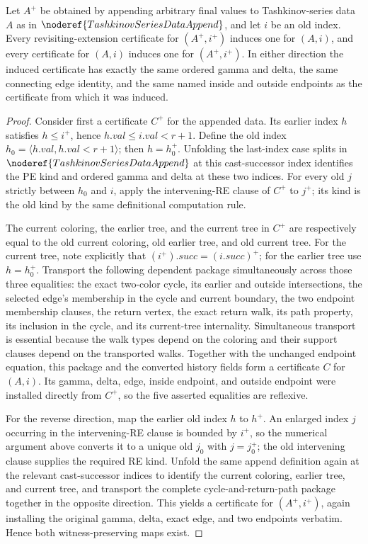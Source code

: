 \begin{lemma}
Let \(A^+\) be obtained by appending arbitrary final values to Tashkinov-series
data \(A\) as in \(\noderef{TashkinovSeriesDataAppend}\), and let \(i\) be an
old index.  Every revisiting-extension certificate for \((A^+,i^+)\) induces
one for \((A,i)\), and every certificate for \((A,i)\) induces one for
\((A^+,i^+)\).  In either direction the induced certificate has exactly the
same ordered gamma and delta, the same connecting edge identity, and the same
named inside and outside endpoints as the certificate from which it was
induced.
\end{lemma}
\begin{proof}
Consider first a certificate \(C^+\) for the appended data.  Its earlier index
\(h\) satisfies \(h\leq i^+\), hence
\(h.val\leq i.val<r+1\).  Define the old index
\(h_0=\langle h.val,h.val<r+1\rangle\); then \(h=h_0^+\).  Unfolding the
last-index case splits in \(\noderef{TashkinovSeriesDataAppend}\) at this
cast-successor index identifies the PE kind and ordered gamma and delta at
these two indices.  For every old
\(j\) strictly between \(h_0\) and \(i\), apply the intervening-RE clause of
\(C^+\) to \(j^+\); its kind is the old kind by the same definitional
computation rule.

The current coloring, the earlier tree, and the current tree in \(C^+\) are
respectively equal to the old current coloring, old earlier tree, and old
current tree.  For the current tree, note explicitly that
\((i^+).succ=(i.succ)^+\); for the earlier tree use \(h=h_0^+\).
Transport the following dependent package simultaneously across those three
equalities: the exact two-color cycle, its earlier and outside intersections,
the selected edge's membership in the cycle and current boundary, the two
endpoint membership clauses, the return vertex, the exact return walk, its
path property, its inclusion in the cycle, and its current-tree internality.
Simultaneous transport is essential because the walk types depend on the
coloring and their support clauses depend on the transported walks.  Together
with the unchanged endpoint equation, this package and the converted history
fields form a certificate \(C\) for \((A,i)\).  Its gamma, delta, edge,
inside endpoint, and outside endpoint were installed directly from \(C^+\),
so the five asserted equalities are reflexive.

For the reverse direction, map the earlier old index \(h\) to \(h^+\).
An enlarged index \(j\) occurring in the intervening-RE clause is bounded by
\(i^+\), so the numerical argument above converts it to a unique old
\(j_0\) with \(j=j_0^+\); the old intervening clause supplies the required
RE kind.  Unfold the same append definition again at the relevant
cast-successor indices to identify the current coloring, earlier tree, and
current tree, and transport the complete cycle-and-return-path package
together in the opposite direction.  This yields a certificate for
\((A^+,i^+)\), again installing the original gamma, delta, exact edge, and two
endpoints verbatim.  Hence both witness-preserving maps exist.
\end{proof}
